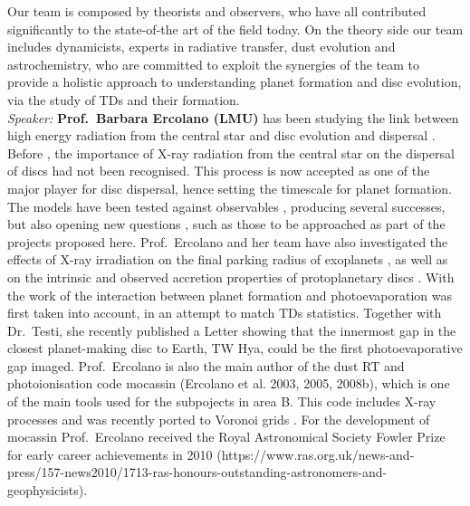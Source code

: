 \documentclass[10pt,fleqn,twoside]{article}
\begin{document}
Our team is composed by theorists and observers, who have all
contributed significantly to the state-of-the art of the field today. 
On the theory side our team includes
dynamicists, experts in radiative transfer, dust evolution and astrochemistry, who are
committed to exploit the synergies of the team to provide a holistic
approach to understanding planet formation and disc evolution, via the
study of TDs and their formation. \\

{\it Speaker: }{\bf Prof.\ Barbara Ercolano (LMU)} has been studying the link between high
energy radiation from the central star and disc evolution and
dispersal \citep[e.g.,][]{2008ApJ...688..398E, 2009ApJ...699.1639E,
2010MNRAS.401.1415O, 2011MNRAS.412...13O, 2012MNRAS.422.1880O}. 
Before \citet{2009ApJ...699.1639E}, the importance
of X-ray radiation from the central star on the dispersal of discs had
not been recognised. This process is now accepted as one of the major
player for disc dispersal, hence setting the timescale for planet
formation. The models have been tested against observables
\citep[e.g.][]{2010MNRAS.406.1553E, 2013MNRAS.434.3378O, 2013MNRAS.428.3327K,
2015MNRAS.452.3689E}, producing
several successes, but also opening new questions 
\citep[e.g.,][]{2016MNRAS.460.3472E}, such as those to be
approached as part of the projects proposed here. Prof.\ Ercolano and
her team have also investigated the effects of X-ray irradiation on
the final parking radius of exoplanets \citep{2015MNRAS.450.3008E}, as
well as on the intrinsic \citep{2013MNRAS.436.3446E, 2013ApJ...764...65M}
and observed
accretion properties of protoplanetary discs \citep{2014MNRAS.439..256E}. 
With the work of \citet{2013MNRAS.430.1392R, 2015MNRAS.454.2173R} 
the interaction between planet formation and photoevaporation was first
taken into account, in an attempt to match TDs
statistics. Together with Dr.\ Testi, she recently published a Letter
showing that the innermost gap in the closest planet-making disc to
Earth, TW Hya, could be the first photoevaporative gap
imaged. Prof.\ Ercolano is also the main author of the dust RT and 
photoionisation code {\sc mocassin} (Ercolano et al. 2003, 2005,
2008b), which is one of the main tools
used for the subpojects in area B. This code includes X-ray processes
and was recently ported to Voronoi grids \citep{2016MNRAS.456..756H}. 
For the development of {\sc
  mocassin} Prof.\ Ercolano received the Royal Astronomical Society
Fowler Prize for early career achievements in 2010 (https://www.ras.org.uk/news-and-press/157-news2010/1713-ras-honours-outstanding-astronomers-and-geophysicists). \\
\end{document}
